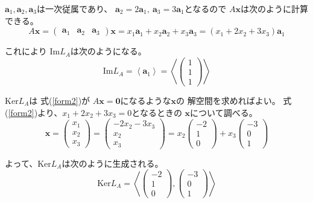 \documentclass[12pt,b5paper]{ltjsarticle}
\begin{document}
\begin{enumerate}
      $\bm{a}_1,\bm{a}_2,\bm{a}_3$は一次従属であり、
      $\bm{a}_2=2\bm{a}_1,\ \bm{a}_3=3\bm{a}_1$となるので
      $A\bm{x}$は次のように計算できる。
      \begin{equation}
       A\bm{x}=
        \begin{pmatrix} \bm{a}_1 & \bm{a}_2 & \bm{a}_3 \end{pmatrix}
        \bm{x}
         =x_1\bm{a}_1 + x_2\bm{a}_2 + x_3 \bm{a}_3
         =(x_1+2x_2+3x_3)\bm{a}_1
         \label{form2}
      \end{equation}

      これにより
      $\mathrm{Im}L_A$は次のようになる。
      \begin{equation}
       \mathrm{Im}L_A
        =\left\langle \bm{a}_1 \right\rangle
        =\left\langle
          \begin{pmatrix} 1 \\ 1 \\ 1 \end{pmatrix}
         \right\rangle
      \end{equation}

      $\mathrm{Ker}L_A$は
      式(\ref{form2})が
      $A\bm{x}=\bm{0}$になるような$\bm{x}$の
      解空間を求めればよい。
      式(\ref{form2})より、$x_1+2x_2+3x_3=0$となるときの
      $\bm{x}$について調べる。
      \begin{equation}
       \bm{x}=
        \begin{pmatrix} x_1 \\ x_2 \\ x_3 \end{pmatrix}
        = \begin{pmatrix} -2x_2-3x_3 \\ x_2 \\ x_3 \end{pmatrix}
        = x_2 \begin{pmatrix} -2 \\ 1 \\ 0 \end{pmatrix}
        + x_3 \begin{pmatrix} -3 \\ 0 \\ 1 \end{pmatrix}
      \end{equation}

      よって、$\mathrm{Ker}L_A$は次のように生成される。
      \begin{equation}
       \mathrm{Ker}L_A
        = \left\langle
           \begin{pmatrix} -2 \\ 1 \\ 0 \end{pmatrix},
           \begin{pmatrix} -3 \\ 0 \\ 1 \end{pmatrix}
          \right\rangle
      \end{equation}



\hrulefill

\end{enumerate}
\end{document}
